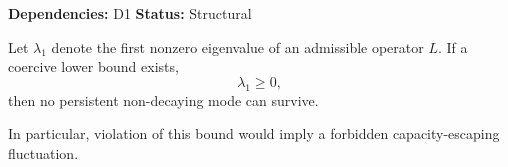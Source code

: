 \begin{lemma}
\textbf{Dependencies: } D1
\textbf{Status: } Structural

Let $\lambda_1$ denote the first nonzero eigenvalue of an admissible operator $L$.
If a coercive lower bound exists,
\[
\lambda_1 \ge 0,
\]
then no persistent non-decaying mode can survive.

In particular, violation of this bound would imply a forbidden
capacity-escaping fluctuation.
\end{lemma}
